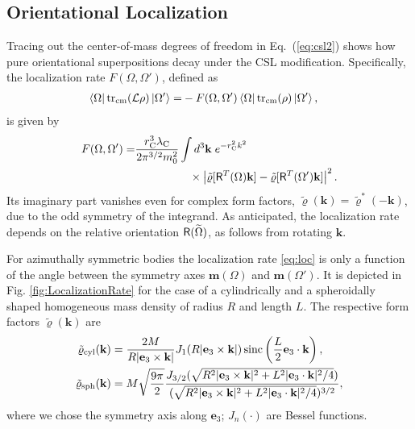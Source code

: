 \documentclass[%
 twocolumn,
 amsmath,amssymb,
 aps,
 pra,
]{revtex4-1}
\newcommand{\op}[1]{{\sf #1}}
\begin{document}
\subsection{Orientational Localization} 
Tracing out the center-of-mass degrees of freedom in Eq.~(\ref{eq:csl2}) shows how pure orientational superpositions decay under the CSL modification. Specifically, the localization rate $F(\Omega,\Omega')$, defined as
\begin{align}
\left<\Omega\right|\mathrm{tr}_{\rm cm}(\mathcal{L} \rho)\left|\Omega'\right>
=&-F(\Omega,\Omega')
\left<\Omega\right|\mathrm{tr}_{\rm cm}(\rho)\left|\Omega'\right>,
\end{align}
is given by
\begin{align} \label{eq:loc}
F(\Omega,\Omega')=&\frac{r^3_{\rm C}\lambda_{\rm C}}{2\pi^{3/2}m_0^2}\int d^3\textbf{k}\hspace{1mm}e^{-r^2_{\rm C}k^2}\nonumber\\
&\hspace{17mm}\times\left\vert \tilde{\varrho}[\op{R}^T(\Omega)\textbf{k}]-\tilde{\varrho}[\op{R}^T(\Omega')\textbf{k}]\right\vert^2.
\end{align}
Its  imaginary part vanishes even for complex form factors, $\tilde{\varrho}(\textbf{k})=\tilde{\varrho}^*(-\textbf{k})$,  
due to the odd symmetry of the integrand.
As anticipated, the localization rate depends  on the relative orientation $\op{R}(\widetilde \Omega)$, as follows from rotating $\textbf{k}$.  

For azimuthally symmetric bodies the localization rate \eqref{eq:loc}  is only a function of the angle between the symmetry axes $\textbf{m}(\Omega)$ and $\textbf{m}(\Omega')$.
It is depicted in Fig. \ref{fig:LocalizationRate} for the case of a cylindrically and a spheroidally shaped homogeneous mass density of radius $R$ and length $L$. The respective form factors $\tilde\varrho(\textbf{k})$ are 
\begin{align}
\tilde{\varrho}_{\rm cyl}(\textbf{k})&=
\frac{2M}{R|\textbf{e}_3\times\textbf{k}|}J_1(R|\textbf{e}_3\times\textbf{k}|)\,{\rm sinc}\left(\frac{L}{2}\textbf{e}_3\cdot\textbf{k}\right),\\
\tilde{\varrho}_{\rm sph}(\textbf{k})&=
M\sqrt{\frac{9\pi}{2}}\frac{J_{3/2}(\sqrt{R^2|\textbf{e}_3\times\textbf{k}|^2+L^2|\textbf{e}_3\cdot\textbf{k}|^2/4})}{(\sqrt{R^2|\textbf{e}_3\times\textbf{k}|^2+L^2|\textbf{e}_3\cdot\textbf{k}|^2/4})^{3/2}},
\end{align}
where we chose the symmetry axis along $\textbf{e}_3$; $J_n(\cdot)$ are Bessel functions. 
\end{document}
